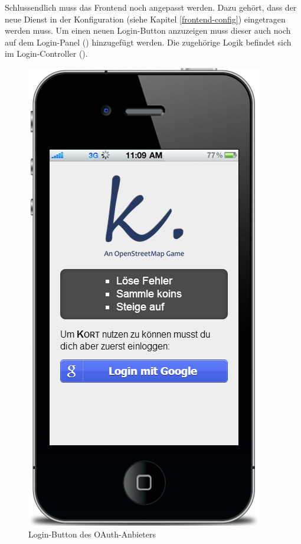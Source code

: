 Schlussendlich muss das Frontend noch angepasst werden.
Dazu gehört, dass der neue Dienst in der Konfiguration (siehe Kapitel \ref{frontend-config}) eingetragen werden muss.
Um einen neuen Login-Button anzuzeigen muss dieser auch noch auf dem Login-Panel () hinzugefügt werden.
Die zugehörige Logik befindet sich im Login-Controller ().
\begin{figure}[H]
	\centering
	\includegraphics[scale=0.5]{images/screenshots/kort-screenshot-login}
	\caption{Login-Button des OAuth-Anbieters}
\end{figure}


